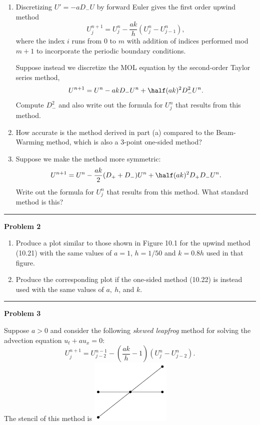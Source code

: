 \documentclass[10pt]{article}
\begin{document}
\begin{enumerate} 
\item Discretizing $U' = -aD_-U$ by forward Euler gives the first order
upwind method
\[
U_j^{n+1} = U_j^n - \frac{ak}{h} (U_j^n - U_{j-1}^n),
\]
where the index $i$ runs from 0 to $m$ with addition of indices performed
mod $m+1$ to incorporate the periodic boundary conditions.

Suppose instead we discretize the MOL equation by the second-order Taylor
series method, 
\[
U^{n+1} = U^n - akD_-U^n + \half (ak)^2 D_-^2 U^n.
\]
Compute $D_-^2$ and also write out the formula for $U_j^n$ that results from
this method.  

\item How accurate is the method derived in part (a) compared to the
Beam-Warming method, which is also a 3-point one-sided method?

\item Suppose we make the method more symmetric:
\[
U^{n+1} = U^n - \frac{ak}{2} (D_+ +D_-)U^n + \half (ak)^2 D_+D_- U^n.
\]
Write out the formula for $U_j^n$ that results from this method.  
What standard method is this?

\end{enumerate}





\vskip 1cm
\hrule
{\bf Problem 2}  


\begin{enumerate} 
\item
Produce a plot similar to those shown in Figure 10.1 for the upwind method
(10.21) with the same values of $a=1$, $h=1/50$ and $k=0.8h$
used in that figure.

\item Produce the corresponding plot if the one-sided method (10.22) is
instead used with the same values of $a,~h$, and $k$.
\end{enumerate}


\vskip 1cm
\hrule
{\bf Problem 3}  

Suppose $a>0$ and consider the following {\it skewed leapfrog} method for
solving the advection equation $u_t + au_x = 0$:
\[
U_j^{n+1} = U_{j-2}^{n-1}  - \left(\frac{ak}{h} - 1\right) (U_j^n -
U_{j-2}^n).
\]
The stencil of this method is
\vskip 5pt
\hfil\includegraphics[width=1.5in]{skewedlfstencil.png}\hfil
\vskip 5pt
\end{document}
